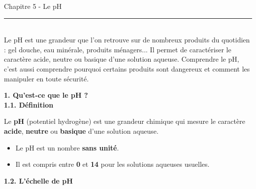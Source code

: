 \documentclass[11pt,a4paper]{article}
\begin{document}
\begin{center}
 \LARGE{Chapitre 5 - Le pH}
\end{center}

\normalsize

\hrule\
\\[0,2cm]

Le pH est une grandeur que l'on retrouve sur de nombreux produits du quotidien : gel douche, eau minérale, produits ménagers... Il permet de caractériser le caractère acide, neutre ou basique d'une solution aqueuse. Comprendre le pH, c'est aussi comprendre pourquoi certains produits sont dangereux et comment les manipuler en toute sécurité.

\vspace{3mm}

\textbf{1. Qu'est-ce que le pH ?} \\

\textbf{1.1. Définition}

\begin{tcolorbox}[colback=red!5!white,colframe=red!75!black]
{
Le \textbf{pH} (potentiel hydrogène) est une grandeur chimique qui mesure le caractère \textbf{acide}, \textbf{neutre} ou \textbf{basique} d'une solution aqueuse.

\begin{itemize}
    \item Le pH est un nombre \textbf{sans unité}.
    \item Il est compris entre \textbf{0} et \textbf{14} pour les solutions aqueuses usuelles.
\end{itemize}
}
\end{tcolorbox}


\textbf{1.2. L'échelle de pH}
\end{document}
